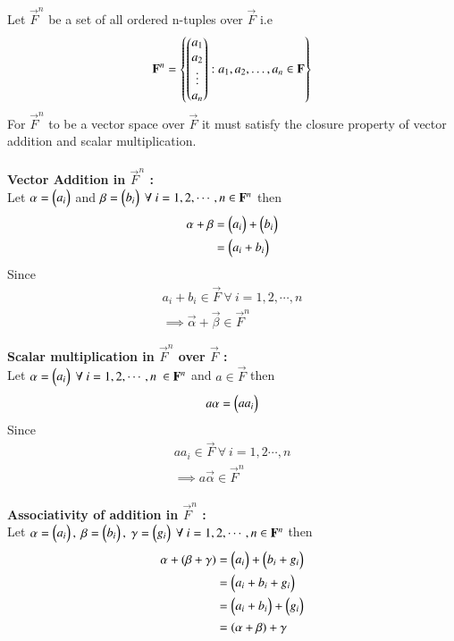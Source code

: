 Let $\vec{F}^n$ be a set of all ordered n-tuples over $\vec{F}$ i.e
\begin{align}
	\mathbf{F}^n= \left\{\begin{pmatrix}a_1 \\ a_2 \\ \vdots \\ a_n\end{pmatrix} : 
	a_1, a_2, \ldots, a_n \in \mathbf{F} \right\}
\end{align}
For $\vec{F}^n$ to be a vector space over $\vec{F}$ it must satisfy the 
closure property of vector addition and scalar multiplication. \\
\\
{\bf Vector Addition in $\vec{F}^n$ :} \\
Let $\mathbf{\alpha} = \begin{pmatrix}a_i\end{pmatrix}$ and
$\mathbf{\beta} = \begin{pmatrix}b_i\end{pmatrix} \ \forall \  i=1,2,\cdots,n \in \mathbf{F}^n$ 
then 
\begin{align}
	\mathbf{\alpha} + \mathbf{\beta} 
	&=\begin{pmatrix}a_i\end{pmatrix}+\begin{pmatrix}b_i\end{pmatrix} \\
	&=\begin{pmatrix}a_i+b_i\end{pmatrix} 
\end{align}
Since 
\begin{align}
	a_i+b_i \in \vec{F} \ \forall \  i=1,2,\cdots,n \\
	\implies \vec{\alpha}+\vec{\beta} \in \vec{F}^n
\end{align}

{\bf Scalar multiplication in $\vec{F}^n$ over $\vec{F}$ :} \\
Let $\vec{\alpha} = \myvec{a_i} \ \forall \ i=1,2,\cdots,n \  
	\in \vec{F}^n$ and  $ a \in \vec{F}$ then
\begin{align}
	a\mathbf{\alpha}=\begin{pmatrix}aa_i\end{pmatrix}
\end{align}
Since
\begin{align}
	aa_i \in \vec{F} \ \forall \ i=1,2\cdots,n \\
	\implies a\vec{\alpha} \in \vec{F}^n
\end{align}
\\
{\bf Associativity of addition in $\vec{F}^n$ :} \\
Let $\vec{\alpha}=\myvec{a_i}, \ 
\vec{\beta}=\myvec{b_i}, 
\ \vec{\gamma}=\myvec{g_i} 
\ \forall \ i=1,2,\cdots,n
\in \vec{F}^n$ then
\begin{align}
	\mathbf{\alpha}+(\mathbf{\beta}+\mathbf{\gamma}) &= 
	\begin{pmatrix}a_i\end{pmatrix} + 
      \begin{pmatrix}b_i+g_i\end{pmatrix} \\
	&= \begin{pmatrix}a_i+b_i+g_i\end{pmatrix} \\
	&= \begin{pmatrix}a_i+b_i\end{pmatrix} + \begin{pmatrix}g_i\end{pmatrix} \\
	&=(\alpha+\beta)+\gamma
\end{align}

